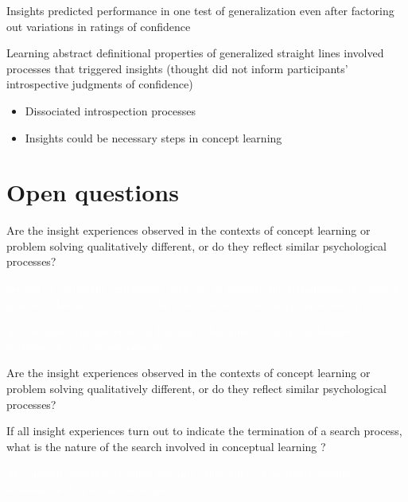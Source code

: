 \documentclass[11pt]{beamer}
\begin{document}
                    \begin{frame}
                      
                      Insights predicted performance in one test of generalization even after factoring out variations in ratings of confidence

                      Learning abstract definitional properties of generalized straight lines involved processes that triggered  insights (thought did not inform participants’ introspective judgments of confidence)

                      \begin{itemize}

                        \item{Dissociated introspection processes }

                        \item{Insights could be necessary steps in concept learning }

                          \end{itemize}


                      \end{frame}
                    
                    \section{Open questions}

                    
                    \begin{frame}

                      Are the insight experiences observed in the contexts of concept learning or problem solving qualitatively different, or do they reflect similar psychological processes?

                     \textcolor{white}{Second, if all insight experiences turn out to indicate the termination of a search process, what is the nature of the search involved in conceptual learning ?}

                     \textcolor{white}{Are insights experiences when learning other kinds of material, besides mathematical or science concepts ?}

                      \end{frame}



                    \begin{frame}

                      Are the insight experiences observed in the contexts of concept learning or problem solving qualitatively different, or do they reflect similar psychological processes?

                      If all insight experiences turn out to indicate the termination of a search process, what is the nature of the search involved in conceptual learning ?

                     \textcolor{white}{Are insights experiences when learning other kinds of material, besides mathematical or science concepts ?}

                      \end{frame}
\end{document}

